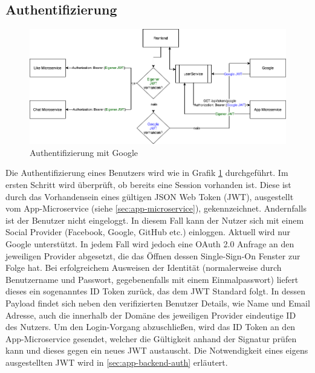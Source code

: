 \documentclass{article}
\begin{document}




\subsection{Authentifizierung}
\label{sec:frontend-auth}

\begin{figure}[H]
\centering
\includegraphics[width=\textwidth]{images/loginFlow}
\caption{Authentifizierung mit Google}
\label{fig:loginFlow}
\end{figure}

Die Authentifizierung eines Benutzers wird wie in Grafik \ref{fig:loginFlow} durchgeführt. Im ersten Schritt wird überprüft, ob bereits eine Session vorhanden ist. Diese ist durch das Vorhandensein eines gültigen JSON Web Token (JWT), ausgestellt vom 
App-Microservice (siehe \autoref{sec:app-microservice}), gekennzeichnet. Andernfalls ist der Benutzer nicht eingeloggt. In diesem Fall kann der Nutzer sich mit einem Social Provider (Facebook, Google, GitHub etc.) einloggen. Aktuell wird nur Google unterstützt. In jedem Fall wird jedoch eine OAuth 2.0 Anfrage an den jeweiligen Provider abgesetzt, die das Öffnen dessen Single-Sign-On Fenster zur Folge hat. Bei erfolgreichem Ausweisen der Identität (normalerweise durch Benutzername und Passwort, gegebenenfalls mit einem Einmalpasswort) liefert dieses ein sogenanntes ID Token zurück, das dem JWT Standard folgt. In dessen Payload findet sich neben den verifizierten Benutzer Details, wie Name und Email Adresse, auch die innerhalb der Domäne des jeweiligen Provider eindeutige ID des Nutzers. Um den Login-Vorgang abzuschließen, wird das ID Token an den App-Microservice gesendet, welcher die Gültigkeit anhand der Signatur prüfen kann und dieses gegen ein neues JWT austauscht. Die Notwendigkeit eines eigens ausgestellten JWT wird in \autoref{sec:app-backend-auth} erläutert.
\end{document}
